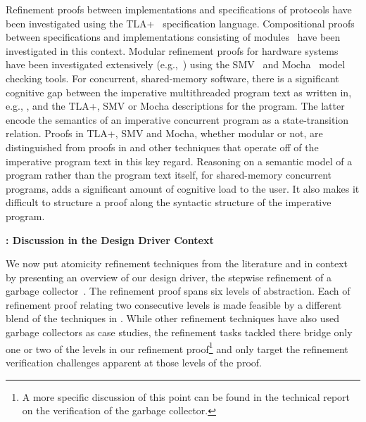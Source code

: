 Refinement proofs
between implementations and specifications of protocols have been
investigated using the TLA+~\cite{Lamport2004} specification
language. 
Compositional proofs between specifications and
implementations consisting of modules~\cite{AbadiAssumeGuarantee} have
been investigated in this context. 
Modular refinement proofs for hardware systems have been investigated extensively
(e.g.,~\cite{Henzinger1999,Eiriksson2000}) using the SMV~\cite{McMillan00} and Mocha~\cite{AlurHMQRT98} 
model checking tools.
For concurrent, shared-memory
software, there is a significant cognitive gap between the imperative
multithreaded program text as written in, e.g., \civl, and the TLA+,
SMV or Mocha descriptions for the program. 
The latter encode the
semantics of an imperative concurrent program as a
state-transition relation. 
Proofs in TLA+, SMV and Mocha, whether modular or not, are
distinguished from proofs in \civl and other techniques that operate
off of the imperative program text in this key regard. 
Reasoning on a
semantic model of a program rather than the program text itself, for
shared-memory concurrent programs, adds a significant amount of
cognitive load to the user. 
It also makes it difficult to structure a
proof along the syntactic structure of the imperative program. 

{\bf: Discussion in the Design Driver Context} 

We now put atomicity refinement techniques from the literature and
\civl in context by presenting an overview of our design
driver, the stepwise refinement of a garbage
collector~\cite{gc-techreport}.
The refinement proof spans six levels of abstraction. 
Each of refinement proof relating two consecutive levels is made feasible by a different
blend of the techniques in \civl. 
While other refinement techniques have also used garbage collectors as
case studies, the refinement tasks tackled there bridge only one or two of the levels in 
our refinement proof\footnote{A more specific discussion of this point
  can be found in the technical report on the verification of the
  garbage collector\cite{gc-techreport}.} and only target the refinement verification
challenges apparent at those levels of the proof. 

